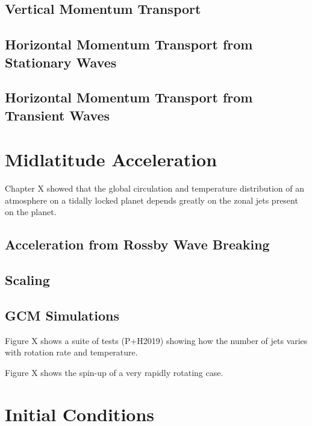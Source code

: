 \subsection*{Vertical Momentum Transport}

\subsection*{Horizontal Momentum Transport from Stationary Waves}

\subsection*{Horizontal Momentum Transport from Transient Waves}




\section{Midlatitude Acceleration}

Chapter X showed that the global circulation and temperature distribution of an atmosphere on a tidally locked planet depends greatly on the zonal jets present on the planet.

\subsection*{Acceleration from Rossby Wave Breaking}

\subsection*{Scaling}

\subsection*{GCM Simulations}

Figure X shows a suite of tests (P+H2019) showing how the number of jets varies with rotation rate and temperature.

Figure X shows the spin-up of a very rapidly rotating case.








\section{Initial Conditions}


